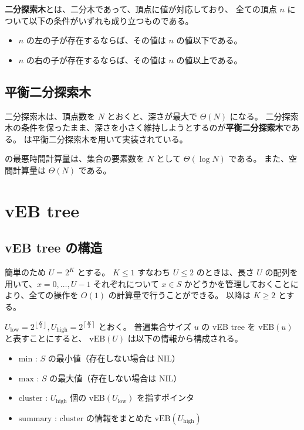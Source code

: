 \documentclass[dvipdfmx,a4j,10pt]{jarticle}
\begin{document}
\textbf{二分探索木}とは、二分木であって、頂点に値が対応しており、
全ての頂点 $n$ について以下の条件がいずれも成り立つものである。

\begin{itemize}
  \item $n$ の左の子が存在するならば、その値は $n$ の値以下である。
  \item $n$ の右の子が存在するならば、その値は $n$ の値以上である。
\end{itemize}

\subsection{平衡二分探索木}

二分探索木は、頂点数を $N$ とおくと、深さが最大で $\Theta(N)$ になる。
二分探索木の条件を保ったまま、深さを小さく維持しようとするのが\textbf{平衡二分探索木}である。
 は平衡二分探索木を用いて実装されている。

 の最悪時間計算量は、集合の要素数を $N$ として $\Theta(\log N)$ である。
また、空間計算量は $\Theta(N)$ である。

\section{vEB tree}

\subsection{vEB tree の構造}

簡単のため $U = 2^K$ とする。
$K \leq 1$ すなわち $U \leq 2$ のときは、長さ $U$ の配列を用いて、$x = 0, \dots, U - 1$ それぞれについて $x \in S$ かどうかを管理しておくことにより、全ての操作を $O(1)$ の計算量で行うことができる。
以降は $K \geq 2$ とする。

$U_{\mathrm{low}} = 2^{\left\lfloor \frac{K}{2} \right\rfloor}, 
U_{\mathrm{high}} = 2^{\left\lceil \frac{K}{2} \right\rceil}$ とおく。
普遍集合サイズ $u$ の vEB tree を $\mathrm{vEB}(u)$ と表すことにすると、
$\mathrm{vEB}(U)$ は以下の情報から構成される。

\begin{itemize}
  \item $\mathrm{min}$ : $S$ の最小値（存在しない場合は $\mathrm{NIL}$）
  \item $\mathrm{max}$ : $S$ の最大値（存在しない場合は $\mathrm{NIL}$）
  \item $\mathrm{cluster}$ : $U_{\mathrm{high}}$ 個の $\mathrm{vEB}(U_{\mathrm{low}})$ を指すポインタ
  \item $\mathrm{summary}$ : $\mathrm{cluster}$ の情報をまとめた $\mathrm{vEB}(U_{\mathrm{high}})$
\end{itemize}
\end{document}
